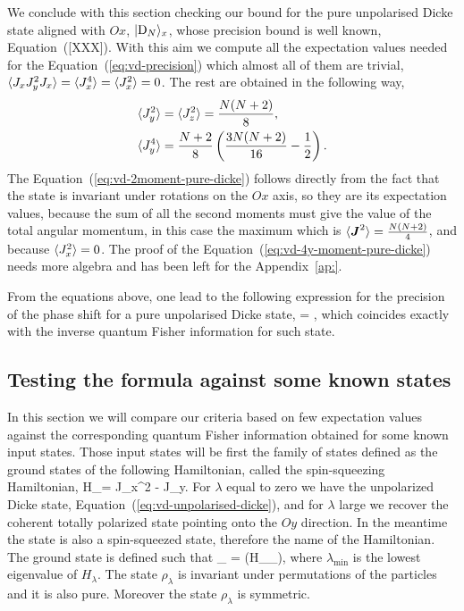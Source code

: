 {We conclude with this section checking our bound for the pure unpolarised Dicke state aligned with $Ox$, $\vert \text{D}_N \rangle_x$, whose precision bound is well known, Equation~{([XXX])}.
With this aim we compute all the expectation values needed for the Equation~{(\ref{eq:vd-precision})} which almost all of them are trivial, $\langle J_xJ_y^2J_x \rangle=\langle J_x^4 \rangle=\langle J_x^2 \rangle=0$.
The rest are obtained in the following way,
\begin{align}
  \langle J_y^2 \rangle & = \langle J_z^2 \rangle = \frac{N (N+2)}{8},
  \label{eq:vd-2moment-pure-dicke}\\
  \langle J_y^4 \rangle & = \frac{N+2}{8}\left(\frac{3N(N+2)}{16}-\frac{1}{2}\right).
  \label{eq:vd-4y-moment-pure-dicke}
\end{align}
The Equation~{(\ref{eq:vd-2moment-pure-dicke})} follows directly from the fact that the state is invariant under rotations on the $Ox$ axis, so they are its expectation values, because the sum of all the second moments must give the value of the total angular momentum, in this case the maximum which is $\langle \boldsymbol{J}^2 \rangle = \frac{N (N+2)}{4}$, and because $\langle J_x^2 \rangle=0$.
The proof of the Equation~{(\ref{eq:vd-4y-moment-pure-dicke})} needs more algebra and has been left for the Appendix~{\ref{ap:}}.

From the equations above, one lead to the following expression for the precision of the phase shift for a pure unpolarised Dicke state,
\be
  \varian{\Theta} = ,
\ee
which coincides exactly with the inverse quantum Fisher information for such state.

\subsection{Testing the formula against some known states}

In this section we will compare our criteria based on few expectation values against the corresponding quantum Fisher information obtained for some known input states.
Those input states will be first the family of states defined as the ground states of the following Hamiltonian, called the spin-squeezing Hamiltonian,
\be
  H_\lambda = J_x^2 - \lambda J_y.
\ee
For $\lambda$ equal to zero we have the unpolarized Dicke state, Equation~{(\ref{eq:vd-unpolarised-dicke})}, and for $\lambda$ large we recover the coherent totally polarized state pointing onto the $Oy$ direction.
In the meantime the state is also a spin-squeezed state, therefore the name of the Hamiltonian.
The ground state is defined such that
\be
  \lambda_{\min} = \tr(H_\lambda \rho_\lambda),
\ee
where $\lambda_{\min}$ is the lowest eigenvalue of $H_\lambda$.
The state $\rho_\lambda$ is invariant under permutations of the particles and it is also pure.
Moreover the state $\rho_\lambda$ is symmetric.

}
